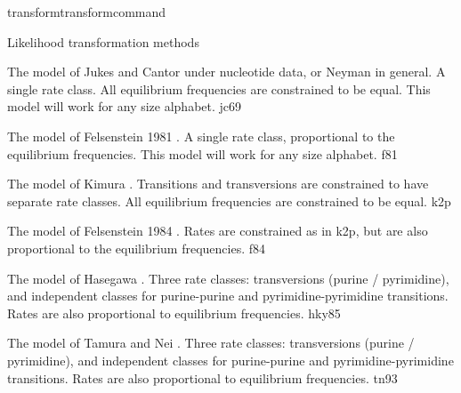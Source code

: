 \begin{command}{transform}{transformcommand}
\begin{arguments}
\begin{argumentgroup}{Likelihood transformation methods}
{                \begin{description}

                        {The model of Jukes and Cantor \cite{jukesandcantor1969}
                        under nucleotide data, or Neyman \cite{neyman1971} in general. A
                        single rate class. All equilibrium frequencies are
                        constrained to be equal. This model will work for any size
                        alphabet.}
                        {jc69}

                        {The model of Felsenstein 1981 \cite{felsenstein1981}. A
                        single rate class, proportional to the equilibrium
                        frequencies. This model will work for any size
                        alphabet.}
                        {f81}

                        {The model of Kimura \cite{kimura1980}. Transitions and
                        transversions are constrained to have separate rate
                        classes. All equilibrium frequencies are constrained to be
                        equal.}
                        {k2p}

                        {The model of Felsenstein 1984 \cite{felsenstein1980}. Rates
                        are constrained as in k2p, but are also proportional to
                        the equilibrium frequencies.}
                        {f84}

                        {The model of Hasegawa \cite{hasegawa1984}. Three rate classes:
                        transversions (purine / pyrimidine), and independent
                        classes for purine-purine and pyrimidine-pyrimidine
                        transitions. Rates are also proportional to equilibrium
                        frequencies.}
                        {hky85}

                        {The model of Tamura and Nei \cite{tamura1993}. Three
                        rate classes: transversions (purine / pyrimidine), and
                        independent classes for purine-purine and
                        pyrimidine-pyrimidine transitions. Rates are also
                        proportional to equilibrium frequencies.}
                        {tn93}


\end{description}}
\end{argumentgroup}
\end{arguments}
\end{command}
